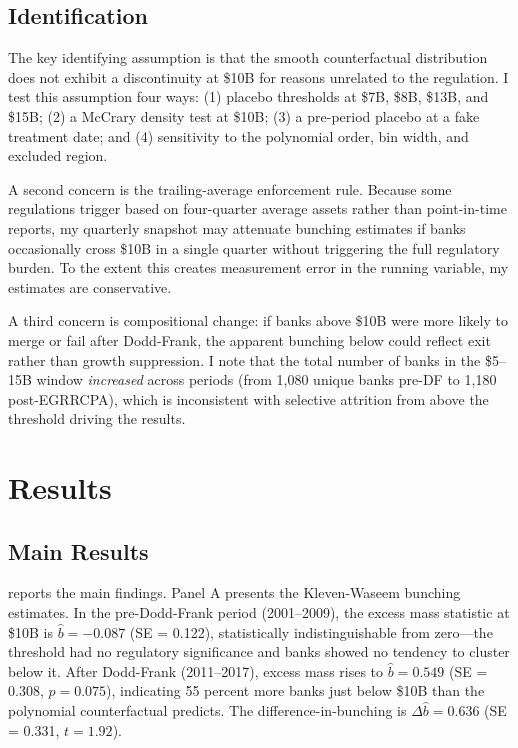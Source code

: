 \documentclass[12pt]{article}
\begin{document}
\subsection{Identification}

The key identifying assumption is that the smooth counterfactual distribution does not exhibit a discontinuity at \$10B for reasons unrelated to the regulation. I test this assumption four ways: (1) placebo thresholds at \$7B, \$8B, \$13B, and \$15B; (2) a McCrary density test at \$10B; (3) a pre-period placebo at a fake treatment date; and (4) sensitivity to the polynomial order, bin width, and excluded region.

A second concern is the trailing-average enforcement rule. Because some regulations trigger based on four-quarter average assets rather than point-in-time reports, my quarterly snapshot may attenuate bunching estimates if banks occasionally cross \$10B in a single quarter without triggering the full regulatory burden. To the extent this creates measurement error in the running variable, my estimates are conservative.

A third concern is compositional change: if banks above \$10B were more likely to merge or fail after Dodd-Frank, the apparent bunching below could reflect exit rather than growth suppression. I note that the total number of banks in the \$5--15B window \textit{increased} across periods (from 1,080 unique banks pre-DF to 1,180 post-EGRRCPA), which is inconsistent with selective attrition from above the threshold driving the results.

\section{Results}
\label{sec:results}

\subsection{Main Results}

 reports the main findings. Panel A presents the Kleven-Waseem bunching estimates. In the pre-Dodd-Frank period (2001--2009), the excess mass statistic at \$10B is $\hat{b} = -0.087$ (SE = 0.122), statistically indistinguishable from zero---the threshold had no regulatory significance and banks showed no tendency to cluster below it. After Dodd-Frank (2011--2017), excess mass rises to $\hat{b} = 0.549$ (SE = 0.308, $p = 0.075$), indicating 55 percent more banks just below \$10B than the polynomial counterfactual predicts. The difference-in-bunching is $\Delta \hat{b} = 0.636$ (SE = 0.331, $t = 1.92$).
\end{document}
